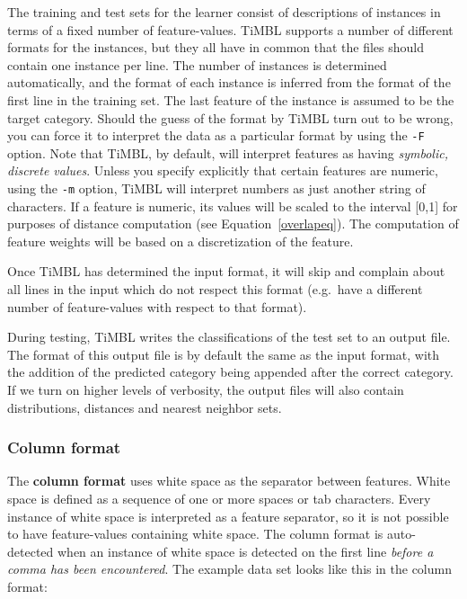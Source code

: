 \documentclass{report}
\begin{document}
The training and test sets for the learner consist of descriptions of
instances in terms of a fixed number of feature-values. TiMBL supports
a number of different formats for the instances, but they all have in
common that the files should contain one instance per line. The number
of instances is determined automatically, and the format of each
instance is inferred from the format of the first line in the training
set. The last feature of the instance is assumed to be the target
category. Should the guess of the format by TiMBL turn out to be
wrong, you can force it to interpret the data as a particular format
by using the {\tt -F} option. Note that TiMBL, by default, will
interpret features as having {\em symbolic, discrete values}. Unless
you specify explicitly that certain features are numeric, using the
{\tt -m} option, TiMBL will interpret numbers as just another string
of characters. If a feature is numeric, its values will be scaled to
the interval [0,1] for purposes of distance computation (see
Equation~\ref{overlapeq}). The computation of feature weights will be
based on a discretization of the feature.

Once TiMBL has determined the input format, it will skip and complain
about all lines in the input which do not respect this format
(e.g.~have a different number of feature-values with respect to that
format).

During testing, TiMBL writes the classifications of the test set to an
output file. The format of this output file is by default the same as
the input format, with the addition of the predicted category being
appended after the correct category. If we turn on higher levels of
verbosity, the output files will also contain distributions, distances
and nearest neighbor sets.

\subsubsection{Column format}
\label{comlumnformat}

The {\bf column format} uses white space as the separator between
features. White space is defined as a sequence of one or more spaces or
tab characters. Every instance of white space is interpreted as a
feature separator, so it is not possible to have feature-values
containing white space. The column format is auto-detected when an
instance of white space is detected on the first line {\em before a
comma has been encountered}. The example data set looks like this in
the column format:
\end{document}
